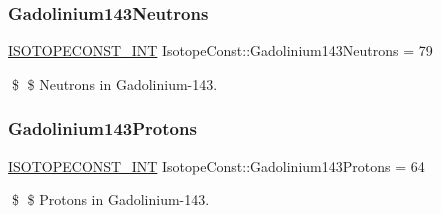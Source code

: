 \subsubsection{\texorpdfstring{Gadolinium143\+Neutrons}{Gadolinium143Neutrons}}
{\footnotesize\ttfamily \mbox{\hyperlink{group___isotope_const-_macros_ga5f18360b3e99483a35c32d789e62621c}{I\+S\+O\+T\+O\+P\+E\+C\+O\+N\+S\+T\+\_\+\+I\+NT}} Isotope\+Const\+::\+Gadolinium143\+Neutrons = 79}

\$ \$ Neutrons in Gadolinium-\/143. \mbox{\label{group___isotope_const-_gadolinium-_gd143_ga9e40ae4e655deac8515802ceff940a36}} 
\subsubsection{\texorpdfstring{Gadolinium143\+Protons}{Gadolinium143Protons}}
{\footnotesize\ttfamily \mbox{\hyperlink{group___isotope_const-_macros_ga5f18360b3e99483a35c32d789e62621c}{I\+S\+O\+T\+O\+P\+E\+C\+O\+N\+S\+T\+\_\+\+I\+NT}} Isotope\+Const\+::\+Gadolinium143\+Protons = 64}

\$ \$ Protons in Gadolinium-\/143. 